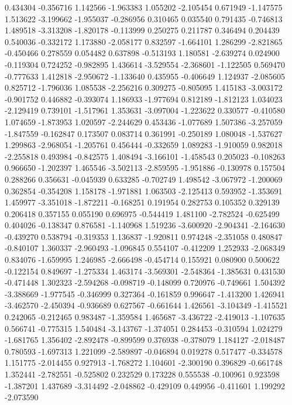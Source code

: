 0.434304
-0.356716
1.142566
-1.963383
1.055202
-2.105454
0.671949
-1.147575
1.513622
-3.199662
-1.955037
-0.286956
0.310465
0.035540
0.791435
-0.746813
1.489518
-3.313208
-1.820178
-0.113999
0.250275
0.211787
0.346494
0.204439
0.540036
-0.332172
1.173880
-2.058177
0.832597
-1.664101
1.286299
-2.821865
-0.450466
0.278559
0.054482
0.637898
-0.513193
1.180581
-2.639274
0.024900
-0.119304
0.724252
-0.982895
1.436614
-3.529554
-2.368601
-1.122505
0.569470
-0.777633
1.412818
-2.950672
-1.133640
0.435955
-0.406649
1.124937
-2.085605
0.825712
-1.796036
1.085538
-2.256216
0.309275
-0.805095
1.415183
-3.003172
-0.901752
0.446882
-0.393074
1.186933
-1.977694
0.812189
-1.812123
1.034023
-2.129419
0.739101
-1.517961
1.353631
-3.097004
-1.223622
0.330577
-0.410580
1.074659
-1.873953
1.020597
-2.244629
0.453436
-1.077689
1.507386
-3.257059
-1.847559
-0.162847
0.173507
0.083714
0.361991
-0.250189
1.080048
-1.537627
1.299863
-2.968054
-1.205761
0.456444
-0.332659
1.089283
-1.910059
0.982018
-2.255818
0.493984
-0.842575
1.408494
-3.166101
-1.458543
0.205023
-0.108263
0.966650
-1.202397
1.465546
-3.502113
-2.859595
-1.951886
-0.130978
0.157504
0.288266
0.356631
-0.045939
0.633285
-0.702749
1.498542
-3.067972
-1.200069
0.362854
-0.354208
1.158178
-1.971881
1.063503
-2.125413
0.593952
-1.353691
1.459977
-3.351018
-1.872211
-0.168251
0.191954
0.282753
0.105352
0.329139
0.206418
0.357155
0.055190
0.696975
-0.544419
1.481100
-2.782524
-0.625499
0.404026
-0.138347
0.876581
-1.140968
1.519236
-3.600920
-2.904341
-2.164630
-0.439270
0.538794
-0.319353
1.136837
-1.920811
0.974248
-2.351058
0.480847
-0.840107
1.360337
-2.960493
-1.096845
0.554107
-0.412209
1.252933
-2.068349
0.834076
-1.659995
1.246985
-2.666498
-0.454714
0.155921
0.080900
0.500622
-0.122154
0.849697
-1.275334
1.463174
-3.569301
-2.548364
-1.385631
0.431530
-0.471448
1.302323
-2.594268
-0.098719
-0.148099
0.720976
-0.749661
1.504392
-3.388669
-1.977545
-0.346999
0.327364
-0.161859
0.996647
-1.413200
1.426941
-3.462570
-2.450394
-0.936689
0.627567
-0.661644
1.426561
-3.104349
-1.415521
0.242065
-0.212465
0.983487
-1.359584
1.465687
-3.436722
-2.419013
-1.107635
0.566741
-0.775315
1.540484
-3.143767
-1.374051
0.284453
-0.310594
1.024279
-1.681765
1.356402
-2.892478
-0.899599
0.376938
-0.378079
1.184127
-2.018487
0.780593
-1.697313
1.221099
-2.589897
-0.046894
0.019278
0.517477
-0.334578
1.151775
-2.014455
0.927913
-1.768272
1.104601
-2.300190
0.396829
-0.661748
1.352441
-2.782551
-0.525802
0.232529
0.173228
0.555538
-0.100961
0.923598
-1.387201
1.437689
-3.314492
-2.048862
-0.429109
0.449956
-0.411601
1.199292
-2.073590
